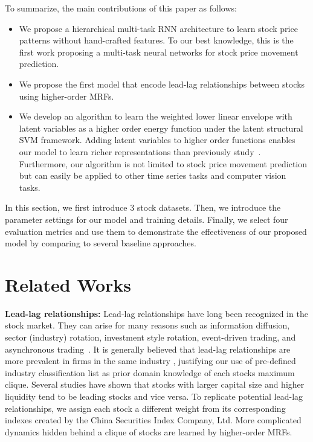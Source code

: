 To summarize, the main contributions of this paper as follows: 
\begin{itemize}
\item We propose a hierarchical multi-task RNN architecture to
  learn stock price patterns without hand-crafted features. To
  our best knowledge, this is the first work proposing a
  multi-task neural networks for stock price movement prediction.
\item We propose the first model that encode lead-lag
  relationships between stocks using higher-order MRFs.
\item We develop an algorithm to learn the weighted lower linear
  envelope with latent variables as a higher order energy function
  under the latent structural SVM framework. Adding latent variables
  to higher order functions enables our model to learn
  richer representations than previously study~\cite{gouldlearning}.
  Furthermore, our algorithm is not limited to
  stock price movement prediction but can easily be applied
  to other time series tasks and computer vision tasks.
\end{itemize}

In this section, we first introduce 3 stock datasets. Then, we
introduce the parameter settings for our model and training
details. Finally, we select four evaluation metrics and use them
to demonstrate the effectiveness of our proposed model by comparing to
several baseline approaches.

\section{Related Works}
\label{sec:background}

\textbf{Lead-lag relationships:} Lead-lag relationships have long
been recognized in the stock market. They can arise for many
reasons such as information diffusion, sector (industry)
rotation, investment style rotation, event-driven trading, and
asynchronous
trading~\cite{lo1990contrarian,chordia2000trading,conrad1988time,hameed1997time}.
It is generally believed that lead-lag relationships are more
prevalent in firms in the same industry \cite{hou2007industry},
justifying our use of pre-defined industry classification list
\cite{ths} as prior domain knowledge of each
stock\textquotesingle s maximum clique. Several studies
\cite{brennan1993investment,hou2007industry,badrinath1995shepherds,mcqueen1996delayed}
have shown that stocks with larger capital size and higher
liquidity tend to be leading stocks and vice versa. To replicate
potential lead-lag relationships, we assign each stock a
different weight from its corresponding indexes created by the
China Securities Index Company, Ltd. More complicated dynamics
hidden behind a clique of stocks are learned by higher-order
MRFs.

